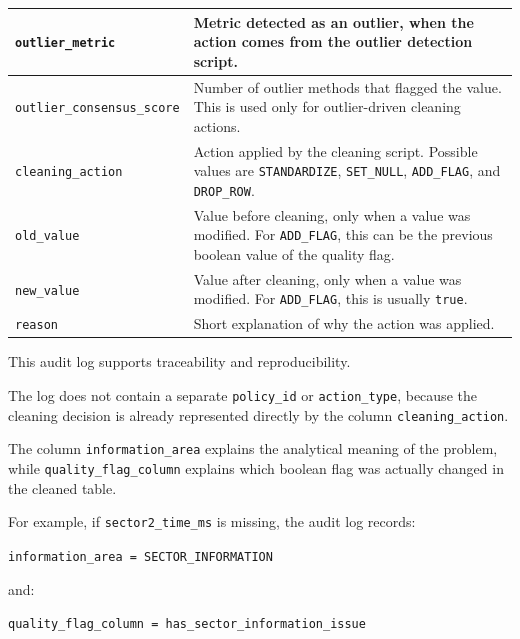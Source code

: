\documentclass[a4paper,11pt]{article}
\begin{document}
\begin{longtable}{p{4.5cm}p{10cm}}
		\texttt{outlier\_metric}
		& Metric detected as an outlier, when the action comes from the outlier detection script. \\
		\midrule
		
		\texttt{outlier\_consensus\_score}
		& Number of outlier methods that flagged the value. This is used only for outlier-driven cleaning actions. \\
		\midrule
		
		\texttt{cleaning\_action}
		& Action applied by the cleaning script. Possible values are \texttt{STANDARDIZE}, \texttt{SET\_NULL}, \texttt{ADD\_FLAG}, and \texttt{DROP\_ROW}. \\
		\midrule
		
		\texttt{old\_value}
		& Value before cleaning, only when a value was modified. For \texttt{ADD\_FLAG}, this can be the previous boolean value of the quality flag. \\
		\midrule
		
		\texttt{new\_value}
		& Value after cleaning, only when a value was modified. For \texttt{ADD\_FLAG}, this is usually \texttt{true}. \\
		\midrule
		
		\texttt{reason}
		& Short explanation of why the action was applied. \\
		\bottomrule
	\end{longtable}
	
	This audit log supports traceability and reproducibility.
	
	The log does not contain a separate \texttt{policy\_id} or \texttt{action\_type}, because the cleaning decision is already represented directly by the column \texttt{cleaning\_action}.
	
	The column \texttt{information\_area} explains the analytical meaning of the problem, while \texttt{quality\_flag\_column} explains which boolean flag was actually changed in the cleaned table.
	
	For example, if \texttt{sector2\_time\_ms} is missing, the audit log records:
	
	\begin{center}
		\texttt{information\_area = SECTOR\_INFORMATION}
	\end{center}
	
	and:
	
	\begin{center}
		\texttt{quality\_flag\_column = has\_sector\_information\_issue}
	\end{center}
	
\end{document}
